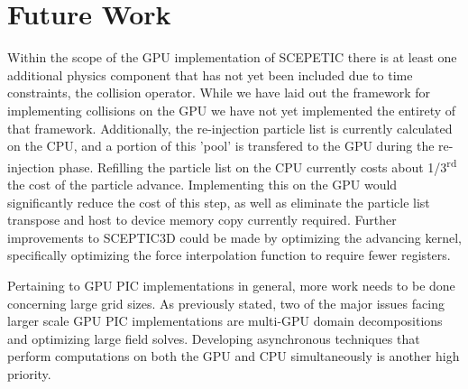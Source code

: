 \section{Future Work}
Within the scope of the GPU implementation of SCEPETIC there is at least one additional physics component that has not yet been included due to time constraints, the collision operator. While we have laid out the framework for implementing collisions on the GPU we have not yet implemented the entirety of that framework. Additionally, the re-injection particle list is currently calculated on the CPU, and a portion of this 'pool' is transfered to the GPU during the re-injection phase. Refilling the particle list on the CPU currently costs about 1/3\textsuperscript{rd} the cost of the particle advance. Implementing this on the GPU would significantly reduce the cost of this step, as well as eliminate the particle list transpose and host to device memory copy currently required. Further improvements to SCEPTIC3D could be made by optimizing the advancing kernel, specifically optimizing the force interpolation function to require fewer registers. 

Pertaining to GPU PIC implementations in general, more work needs to be done concerning large grid sizes. As previously stated, two of the major issues facing larger scale GPU PIC implementations are multi-GPU domain decompositions and optimizing large field solves. Developing asynchronous techniques that perform computations on both the GPU and CPU simultaneously is another high priority. 



